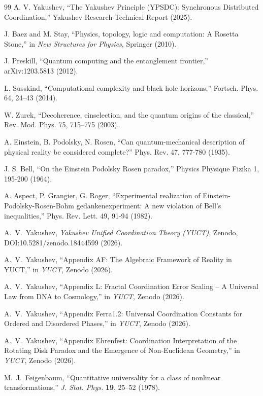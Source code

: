 \documentclass[11pt,a4paper]{article}
\begin{document}
\begin{thebibliography}{99}
		 A. V. Yakushev, ``The Yakushev Principle (YPSDC): Synchronous Distributed Coordination,'' Yakushev Research Technical Report (2025).
		
		 J. Baez and M. Stay, ``Physics, topology, logic and computation: A Rosetta Stone,'' in \emph{New Structures for Physics}, Springer (2010).
		
		 J. Preskill, ``Quantum computing and the entanglement frontier,'' arXiv:1203.5813 (2012).
		
		 L. Susskind, ``Computational complexity and black hole horizons,'' Fortsch. Phys. 64, 24–43 (2014).
		
		 W. Zurek, ``Decoherence, einselection, and the quantum origins of the classical,'' Rev. Mod. Phys. 75, 715–775 (2003).
		
		 A. Einstein, B. Podolsky, N. Rosen, ``Can quantum-mechanical description of physical reality be considered complete?'' Phys. Rev. 47, 777-780 (1935).
		
		 J. S. Bell, ``On the Einstein Podolsky Rosen paradox,'' Physics Physique Fizika 1, 195-200 (1964).
		
		 A. Aspect, P. Grangier, G. Roger, ``Experimental realization of Einstein-Podolsky-Rosen-Bohm gedankenexperiment: A new violation of Bell's inequalities,'' Phys. Rev. Lett. 49, 91-94 (1982).
		
		A.~V.~Yakushev, \emph{Yakushev Unified Coordination Theory (YUCT)}, Zenodo, DOI:10.5281/zenodo.18444599 (2026).
		
		A.~V.~Yakushev, ``Appendix AF: The Algebraic Framework of Reality in YUCT,'' in \emph{YUCT}, Zenodo (2026).
		
		A.~V.~Yakushev, ``Appendix L: Fractal Coordination Error Scaling – A Universal Law from DNA to Cosmology,'' in \emph{YUCT}, Zenodo (2026).
		
		A.~V.~Yakushev, ``Appendix Ferra1.2: Universal Coordination Constants for Ordered and Disordered Phases,'' in \emph{YUCT}, Zenodo (2026).
		
		A.~V.~Yakushev, ``Appendix Ehrenfest: Coordination Interpretation of the Rotating Disk Paradox and the Emergence of Non‑Euclidean Geometry,'' in \emph{YUCT}, Zenodo (2026).
		
		M.~J.~Feigenbaum, ``Quantitative universality for a class of nonlinear transformations,'' \emph{J. Stat. Phys.} \textbf{19}, 25--52 (1978).
		

\end{thebibliography}
\end{document}
